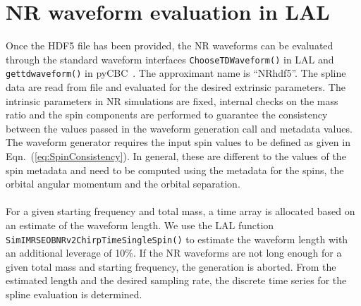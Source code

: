 \documentclass[aps,prd,amssymb,amsmath,amsfonts,superscriptaddress,
floatfix ,preprintnumbers,altaffilletter]{revtex4}
\begin{document}
\section{NR waveform evaluation in LAL}
\label{sec:gen}
Once the HDF5 file has been provided, the NR waveforms can be evaluated through the standard waveform interfaces \texttt{ChooseTDWaveform()} in LAL and \texttt{get\textunderscore td\textunderscore waveform()} in pyCBC~\cite{Canton:2014ena}. The approximant name is ``NR\textunderscore hdf5''. 
The spline data are read from file and evaluated for the desired extrinsic parameters. The intrinsic parameters in NR simulations are fixed, internal checks on the mass ratio and the spin components are performed to guarantee the consistency between the values passed in the waveform generation call and metadata values. The waveform generator requires the input spin values to be defined as given in Eqn.~(\ref{eq:SpinConsistency}). In general, these are different to the values of the spin metadata and need to be computed using the metadata for the spins, the orbital angular momentum and the orbital separation.\\
\\For a given starting frequency and total mass, a time array is allocated based on an estimate of the waveform length. We use the LAL function 
\texttt{SimIMRSEOBNRv2ChirpTimeSingleSpin()} to estimate the waveform length with an additional leverage of 10\%. If the NR waveforms are not long enough for a given total mass and starting frequency, the generation is aborted. From the estimated length and the desired sampling rate, the discrete time series for the spline evaluation is
determined.\\
\end{document}

